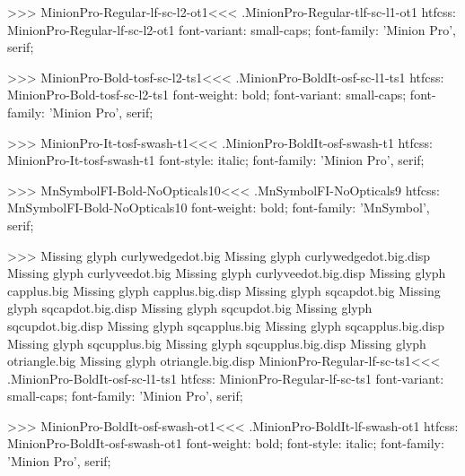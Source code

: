 {>>>
\<MinionPro-Regular-lf-sc-l2-ot1\><<<
.MinionPro-Regular-tlf-sc-l1-ot1
htfcss:  MinionPro-Regular-lf-sc-l2-ot1  font-variant: small-caps; font-family: 'Minion Pro', serif;

>>>
\<MinionPro-Bold-tosf-sc-l2-ts1\><<<
.MinionPro-BoldIt-osf-sc-l1-ts1
htfcss:  MinionPro-Bold-tosf-sc-l2-ts1  font-weight: bold; font-variant: small-caps; font-family: 'Minion Pro', serif;

>>>
\<MinionPro-It-tosf-swash-t1\><<<
.MinionPro-BoldIt-osf-swash-t1
htfcss:  MinionPro-It-tosf-swash-t1  font-style: italic; font-family: 'Minion Pro', serif;

>>>
\<MnSymbolFI-Bold-NoOpticals10\><<<
.MnSymbolFI-NoOpticals9
htfcss:  MnSymbolFI-Bold-NoOpticals10  font-weight: bold; font-family: 'MnSymbol', serif;

>>>
Missing glyph	curlywedgedot.big
Missing glyph	curlywedgedot.big.disp
Missing glyph	curlyveedot.big
Missing glyph	curlyveedot.big.disp
Missing glyph	capplus.big
Missing glyph	capplus.big.disp
Missing glyph	sqcapdot.big
Missing glyph	sqcapdot.big.disp
Missing glyph	sqcupdot.big
Missing glyph	sqcupdot.big.disp
Missing glyph	sqcapplus.big
Missing glyph	sqcapplus.big.disp
Missing glyph	sqcupplus.big
Missing glyph	sqcupplus.big.disp
Missing glyph	otriangle.big
Missing glyph	otriangle.big.disp
\<MinionPro-Regular-lf-sc-ts1\><<<
.MinionPro-BoldIt-osf-sc-l1-ts1
htfcss:  MinionPro-Regular-lf-sc-ts1  font-variant: small-caps; font-family: 'Minion Pro', serif;

>>>
\<MinionPro-BoldIt-osf-swash-ot1\><<<
.MinionPro-BoldIt-lf-swash-ot1
htfcss:  MinionPro-BoldIt-osf-swash-ot1  font-weight: bold; font-style: italic; font-family: 'Minion Pro', serif;

}
